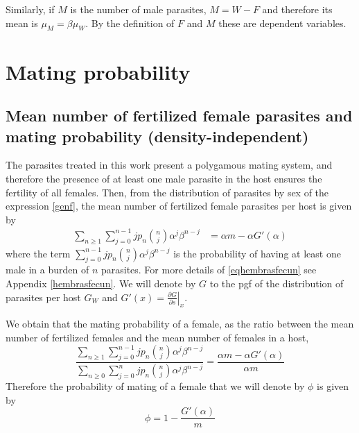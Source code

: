 \documentclass[bimj,fleqn]{w-art}
\theoremstyle{plain}
\theoremstyle{definition}
\begin{document}
Similarly, if $M$ is the number of male parasites,  $M = W - F$ and therefore its mean is $\mu_M=\beta\mu_W$. By the definition of $F$ and $M$ these are dependent variables.

\section{Mating probability}
\label{sec:probapareamiento}
\subsection{Mean number of fertilized female parasites and mating probability (density-independent)}

The parasites treated in this work present a polygamous mating system, and therefore the presence of at least one male parasite in the host ensures the fertility of all females.
Then, from the distribution of parasites by sex 
of the expression 
\eqref{genf}, the mean number of fertilized female parasites per host is given by
\begin{equation}\label{eqhembrasfecun}
\begin{split}
\sum_{n\geq 1}\sum_{j=0}^{n-1}j p_n\binom{n}{j}\alpha^j\beta^{n-j}
&=\alpha  m - \alpha G'(\alpha)
\end{split}
\end{equation}
where the term $\sum_{j=0}^{n-1}j p_n\binom{n}{j}\alpha^j\beta^{n-j}$ 
is the probability of having at least one male in a burden of $n$ parasites. 
For more details of \eqref{eqhembrasfecun} see Appendix \eqref{hembrasfecun}. 
We will denote by $G$ to the pgf of the distribution of parasites per host $G_W$
and  $G'(x)=\left.\frac{\partial G}{\partial s}\right|_{x}$.


We obtain that the mating probability of a female, as the ratio between the mean number of fertilized females and the mean number of females in a host,
\begin{equation*}
\frac{\sum_{n\geq 1}\sum_{j=0}^{n-1}jp_n\binom{n}{j}\alpha^j\beta^{n-j}}
{\sum_{n\geq 0}\sum_{j=0}^{n}jp_n\binom{n}{j}\alpha^j\beta^{n-j}}
=\frac{\alpha  m -\alpha  G'(\alpha)}{\alpha m}
\end{equation*}
Therefore the probability of mating of a female that we will denote by $\phi$ is given by
\begin{equation}\label{probrepro1}
\phi=1-\frac{ G'(\alpha)}{m}
\end{equation}
\end{document}
